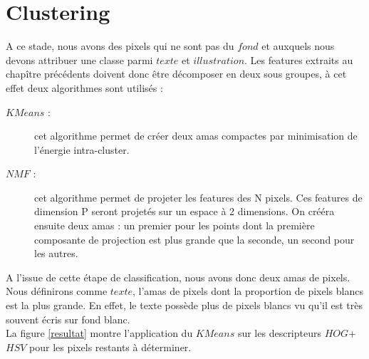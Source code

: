 \documentclass{book}
\begin{document}
\chapter{Clustering}

A ce stade, nous avons des pixels qui ne sont pas du $fond$ et auxquels nous devons attribuer une classe parmi $texte$ et $illustration$.
Les features extraits au chapître précédents doivent donc être décomposer en deux sous groupes, à cet effet deux algorithmes sont utilisés :
\begin{description} %

\item[$KMeans$ :] cet algorithme permet de créer deux amas compactes par minimisation de l'énergie intra-cluster.
\item[$NMF$ :] cet algorithme permet de projeter les features des N pixels. Ces features de dimension P seront projetés sur un espace à 2 dimensions. On crééra ensuite
deux amas : un premier pour les points dont la première composante de projection est plus grande que la seconde, un second pour les autres.

\end{description}

A l'issue de cette étape de classification, nous avons donc deux amas de pixels. Nous définirons comme $texte$, l'amas de pixels dont la proportion de pixels blancs
est la plus grande. En effet, le texte possède plus de pixels blancs vu qu'il est très souvent écris sur fond blanc.\\
La figure \ref{resultat} montre l'application du $KMeans$ sur les descripteurs $HOG$+$HSV$ pour les pixels restants à déterminer.
\end{document}
